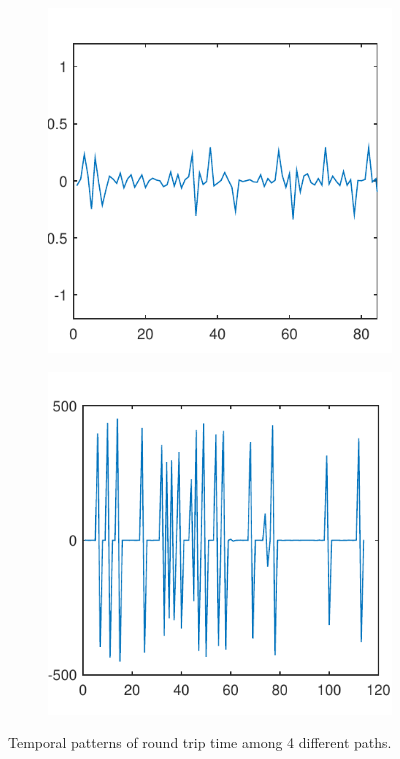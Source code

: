 \documentclass[sigconf]{acmart}
\begin{document}
\begin{figure}[!htp]
\begin{subfigure}[t]{0.45\linewidth}
			\label{fig:3.3b}
		\end{subfigure}
		\begin{subfigure}[t]{0.45\linewidth}
			\centering
			\includegraphics[width=0.95\linewidth]{fig/RTT_21}
			\label{fig:3.3c}
		\end{subfigure}
		\begin{subfigure}[t]{0.45\linewidth}
			\centering
			\includegraphics[width=0.95\linewidth]{fig/RTT_30}
			\label{fig:3.3d}
		\end{subfigure}
		\caption{Temporal patterns of round trip time among 4 different paths.}
		\label{fig:3.3}
	\end{figure}
	
\end{document}
